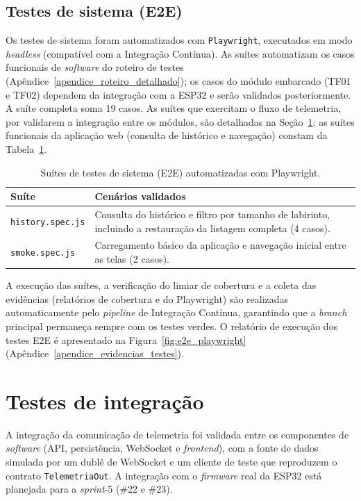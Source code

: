 \subsection{Testes de sistema (E2E)}

Os testes de sistema foram automatizados com \texttt{Playwright}, executados em modo
\textit{headless} (compatível com a Integração Contínua). As suítes automatizam os
casos funcionais de \textit{software} do roteiro de testes
(Apêndice~\ref{apendice_roteiro_detalhado}); os casos do módulo embarcado (TF01 e
TF02) dependem da integração com a ESP32 e serão validados posteriormente. A suíte
completa soma 19 casos. As suítes que exercitam o fluxo de telemetria, por validarem
a integração entre os módulos, são detalhadas na Seção~\ref{sec:testes_integracao};
as suítes funcionais da aplicação web (consulta de histórico e navegação) constam da
Tabela~\ref{tab:suites_e2e}.

\begin{table}[H]
    \centering
    \caption{Suítes de testes de sistema (E2E) automatizadas com Playwright.}
    \label{tab:suites_e2e}
    \small
    \begin{tabular}{|l|p{9.3cm}|}
        \hline
        \textbf{Suíte} & \textbf{Cenários validados} \\ \hline
        \texttt{history.spec.js} & Consulta do histórico e filtro por tamanho de
        labirinto, incluindo a restauração da listagem completa (4 casos). \\ \hline
        \texttt{smoke.spec.js} & Carregamento básico da aplicação e navegação inicial
        entre as telas (2 casos). \\ \hline
    \end{tabular}
\end{table}

A execução das suítes, a verificação do limiar de cobertura e a coleta das evidências
(relatórios de cobertura e do Playwright) são realizadas automaticamente pelo
\textit{pipeline} de Integração Contínua, garantindo que a \textit{branch} principal
permaneça sempre com os testes verdes. O relatório de execução dos testes E2E é
apresentado na Figura~\ref{fig:e2e_playwright} (Apêndice~\ref{apendice_evidencias_testes}).

\section{Testes de integração}
\label{sec:testes_integracao}

A integração da comunicação de telemetria foi validada entre os componentes de
\textit{software} (API, persistência, WebSocket e \textit{frontend}), com a fonte de
dados simulada por um dublê de WebSocket e um cliente de teste que reproduzem o
contrato \texttt{TelemetriaOut}. A integração com o \textit{firmware} real da ESP32 está
planejada para a \textit{sprint}-5 (\#22 e \#23).


